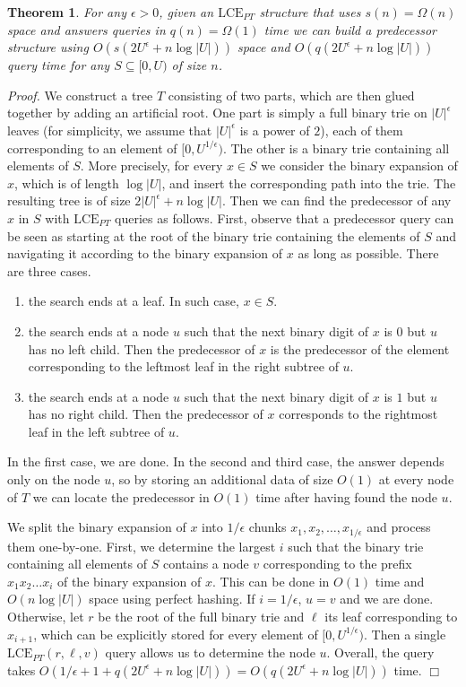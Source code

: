 \documentclass [10pt]{article}
\newtheorem{theorem}{Theorem}
\newcommand{\qed}{\hfill\ensuremath{\Box}\medskip\\\noindent}
\newenvironment{proof}{\noindent\emph{Proof. }}{}
\newcommand{\LCEPT}{\ensuremath{\mathrm{LCE}_{\mathit{PT}}}}
\begin{document}
\begin{theorem}
For any $\epsilon>0$, given an $\LCEPT$ structure that uses $s(n)=\Omega(n)$ space and answers queries in $q(n)=\Omega(1)$ time we can build
a predecessor structure using $O(s(2U^{\epsilon}+n\log|U|))$ space and $O(q(2U^{\epsilon}+n\log|U|))$ query time for any $S\subseteq [0,U)$ of
size $n$.
\end{theorem}

\begin{proof}
We construct a tree $T$ consisting of two parts, which are then glued together by adding an artificial root. One part is simply a full binary trie
on $|U|^{\epsilon}$ leaves (for simplicity, we assume that $|U|^{\epsilon}$ is a power of $2$), each of them corresponding to an element of
$[0,U^{1/\epsilon})$. The other is a binary trie containing all elements of $S$.
More precisely, for every $x\in S$ we consider the binary expansion of $x$, which is of length $\log|U|$, and insert the corresponding path
into the trie. The resulting tree is of size $2|U|^{\epsilon}+n\log |U|$. Then we can find the predecessor of any $x$ in $S$ with $\LCEPT$ queries as
follows. First, observe that a predecessor query can be seen as starting at the root of the binary trie containing the elements of $S$ and
navigating it according to the binary expansion of $x$ as long as possible. There are three cases.

\begin{enumerate}
\item the search ends at a leaf. In such case, $x\in S$.
\item the search ends at a node $u$ such that the next binary digit of $x$ is $0$ but $u$ has no left child. Then the predecessor of $x$ is
the predecessor of the element corresponding to the leftmost leaf in the right subtree of $u$.
\item the search ends at a node $u$ such that the next binary digit of $x$ is $1$ but $u$ has no right child. Then the predecessor of $x$ corresponds
to the rightmost leaf in the left subtree of $u$.
\end{enumerate}

In the first case, we are done. In the second and third case, the answer depends only on the node $u$, so by storing an additional data of size $O(1)$
at every node of $T$ we can locate the predecessor in $O(1)$ time after having found the node $u$.

We split the binary expansion of $x$ into
$1/\epsilon$ chunks $x_{1},x_{2},\ldots,x_{1/\epsilon}$ and process them one-by-one. First, we determine the largest $i$ such that the binary
trie containing all elements of $S$ contains a node $v$ corresponding to the prefix $x_{1}x_{2}\ldots x_{i}$ of the binary expansion of $x$.
This can be done in $O(1)$ time and $O(n\log|U|)$ space using perfect hashing. If $i=1/\epsilon$, $u=v$ and we are done. Otherwise, let
$r$ be the root of the full binary trie and $\ell$ its leaf corresponding to $x_{i+1}$, which can be explicitly stored for every element of
$[0,U^{1/\epsilon})$. Then a single $\LCEPT(r,\ell,v)$ query allows us to determine the node $u$. Overall, the query takes
$O(1/\epsilon+1+q(2U^{\epsilon}+n\log|U|))=O(q(2U^{\epsilon}+n\log|U|))$ time. \qed
\end{proof}
\end{document}
